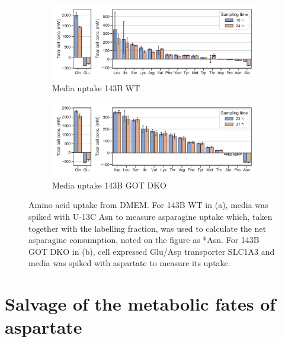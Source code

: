 \begin{figure}
     \centering
     \begin{subfigure}[b]{0.7\textwidth}
         \centering
         \includegraphics[width=\textwidth]{figures/chap2/tcc_143wt.pdf}
         \caption{Media uptake 143B WT}
         \label{fig:tcc_143wt}
     \end{subfigure}
     \begin{subfigure}[b]{0.7\textwidth}
         \centering
         \includegraphics[width=\textwidth]{figures/chap2/tcc_143dko.pdf}
         \caption{Media uptake 143B GOT DKO}
         \label{fig:tcc_143dko}
     \end{subfigure}
        \caption[Media amino acid uptake]{
        Amino acid uptake from DMEM.
        For 143B WT in (a), media was spiked with U-13C Asn to measure asparagine uptake which, taken together with the labelling fraction, was used to calculate the net asparagine consumption, noted on the figure as *Asn.
        For 143B GOT DKO in (b), cell expressed Glu/Asp transporter SLC1A3 and media was spiked with aspartate to measure its uptake.
        }
\end{figure}













\section{Salvage of the metabolic fates of aspartate}

